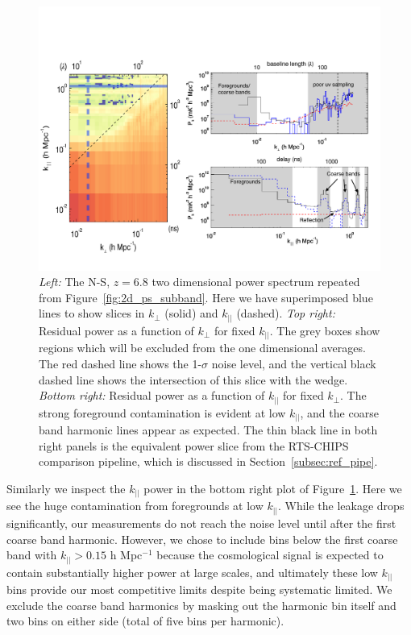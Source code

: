 \documentclass[iop]{emulateapj}
\begin{document}
\begin{figure}
\begin{center}
\includegraphics[width=\textwidth]{slices.pdf}
\caption{
\emph{Left:} The N-S, $z=6.8$ two dimensional power spectrum repeated from 
Figure~\ref{fig:2d_ps_subband}. Here we have superimposed blue lines to show slices in
$k_{\perp}$ (solid) and $k_{||}$ (dashed). \emph{Top right:} Residual power as a function
of $k_{\perp}$ for fixed $k_{||}$. The grey boxes show regions which will be excluded from
the one dimensional averages. The red dashed line shows the 1-$\sigma$ noise level, and
the vertical black dashed line shows the intersection of this slice with the wedge. 
\emph{Bottom right:} Residual power as a function of $k_{||}$ for fixed $k_{\perp}$. The strong
foreground contamination is evident at low $k_{||}$, and the coarse band harmonic lines
appear as expected. The thin black line in both right panels is the equivalent power slice from the RTS-CHIPS comparison pipeline, which is discussed in Section~\ref{subsec:ref_pipe}.
\label{fig:slices}
}
\end{center}
\end{figure}

Similarly we inspect the $k_{||}$ power in the bottom right plot of Figure~\ref{fig:slices}. Here
we see the huge contamination from foregrounds at low $k_{||}$. While the leakage drops 
significantly, our measurements do not reach the noise level until after the first coarse
band harmonic. However, we chose to include bins below the first coarse band with 
$k_{||}>0.15$ h Mpc$^{-1}$ because the cosmological signal is expected to contain 
substantially higher power at large scales, and ultimately these low $k_{||}$ bins provide
our most competitive limits despite being systematic limited. We exclude the coarse band
harmonics by masking out the harmonic bin itself and two bins on either side (total of five
bins per harmonic).
\end{document}
